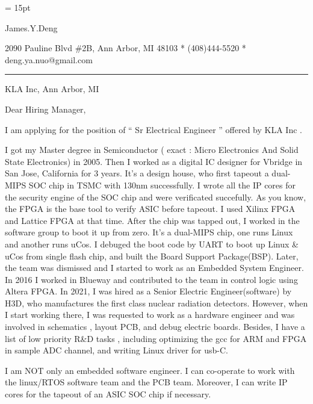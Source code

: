 

  \FFrg \baselineskip = 15pt

{
James.Y.Deng
}

{ 
2090 Pauline Blvd \#2B, Ann Arbor, MI 48103
*
(408)444-5520
*
deng.ya.nuo@gmail.com
}

{ \smallbreak } 

{\par\noindent\hrule} 

{ \bigbreak } 



KLA Inc, 
Ann Arbor, MI


{ \bigbreak } 
{ 
Dear Hiring Manager,
}

{ \bigbreak } 
I am applying for the position of `` 
Sr Electrical Engineer
'' offered by KLA Inc .

{ \bigbreak } 
I got my Master degree in Semiconductor ( exact : Micro Electronics And Solid State Electronics) in 2005.
Then I worked as a digital IC designer for Vbridge in San Jose, California for 3 years.
It's a design house, who first tapeout a dual-MIPS SOC chip in TSMC with 130nm successfully.
I wrote all the IP cores for the security engine of the SOC chip and were verificated succefully.
As you know, the FPGA is the base tool to verify ASIC before tapeout.
I used Xilinx FPGA and Lattice FPGA at that time.
After the chip was tapped out, I worked in the software group to boot it up from zero.
It's a dual-MIPS chip, one runs Linux and another runs uCos.
I debuged the boot code by UART to boot up Linux \& uCos from single flash chip,
and built the Board Support Package(BSP).
Later, the team was dismissed and I started to work as an Embedded System Engineer.
In 2016 I worked in Blueway and contributed to the team in control logic using Altera FPGA.
In 2021, I was hired as a Senior Electric Engineer(software) by H3D, 
who manufactures the first class nuclear radiation detectors.
However, when I start working there, I was requested to work as
a hardware engineer and was involved in schematics , layout PCB, and debug electric boards.
Besides, I have a list of low priority R\&D tasks , 
including optimizing the gcc for ARM and FPGA in sample ADC channel,
and writing Linux driver for usb-C.

{ \bigbreak } 
I am NOT only an embedded software engineer. 
I can co-operate to work with the linux/RTOS software team and the PCB team.
Moreover, I can write IP cores for the tapeout of an ASIC SOC chip if necessary.

